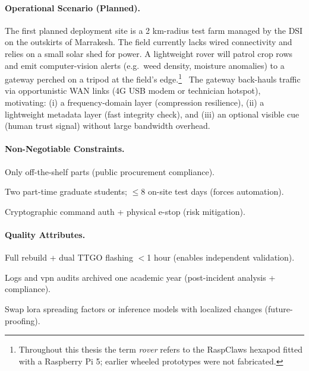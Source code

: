 \paragraph{\textbf{Operational Scenario (Planned).}}
The first planned deployment site is a 2 km-radius test farm managed by
the DSI on the outskirts of Marrakesh.
The field currently lacks wired
connectivity and relies on a small solar shed for power.
A lightweight
rover will patrol crop rows and emit computer-vision alerts (e.g.\ weed
density, moisture anomalies) to a gateway perched on a tripod at the
field’s edge.\footnote{Throughout this thesis the term \emph{rover}
refers to the RaspClaws hexapod fitted with a Raspberry Pi 5; earlier
wheeled prototypes were not fabricated.}%
\ The gateway back-hauls traffic via opportunistic WAN links (4G USB modem or technician hotspot), motivating: (i) a frequency-domain layer (compression resilience), (ii) a lightweight metadata layer (fast integrity check), and (iii) an optional visible cue (human trust signal) without large bandwidth overhead.

\paragraph{\textbf{Non-Negotiable Constraints.}}
\begin{description}[leftmargin=3.2cm,style=sameline]
    \item[\textbf{Budget}] Only off-the-shelf parts (public procurement compliance).
    \item[\textbf{Man-hours}] Two part-time graduate students; $\le 8$ on-site test days (forces automation).
    \item[\textbf{Safety}] Cryptographic command auth + physical e-stop (risk mitigation).
\end{description}

\paragraph{\textbf{Quality Attributes.}}
\begin{description}[leftmargin=3.2cm,style=sameline]
    \item[\textbf{Reproducibility}] Full rebuild + dual TTGO flashing $<$1 hour (enables independent validation).
    \item[\textbf{Traceability}] Logs and \gls{vpn} audits archived one academic year (post-incident analysis + compliance).
    \item[\textbf{Evolvability}] Swap \gls{lora} spreading factors or inference models with localized changes (future-proofing).
\end{description}

